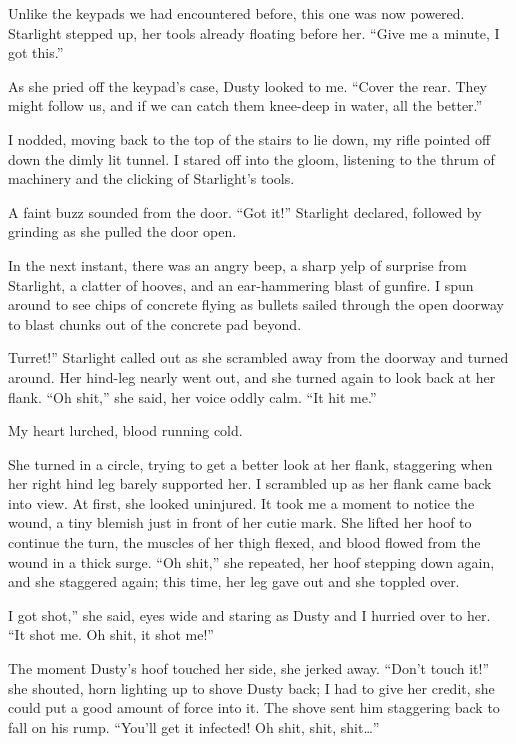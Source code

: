 Unlike the keypads we had encountered before, this one was now powered. Starlight stepped up, her tools already floating before her. “Give me a minute, I got this.”

As she pried off the keypad’s case, Dusty looked to me. “Cover the rear. They might follow us, and if we can catch them knee-deep in water, all the better.”

I nodded, moving back to the top of the stairs to lie down, my rifle pointed off down the dimly lit tunnel. I stared off into the gloom, listening to the thrum of machinery and the clicking of Starlight’s tools.

A faint buzz sounded from the door. “Got it!” Starlight declared, followed by grinding as she pulled the door open.

In the next instant, there was an angry beep, a sharp yelp of surprise from Starlight, a clatter of hooves, and an ear-hammering blast of gunfire. I spun around to see chips of concrete flying as bullets sailed through the open doorway to blast chunks out of the concrete pad beyond.

\leavevmode{}Turret!” Starlight called out as she scrambled away from the doorway and turned around. Her hind-leg nearly went out, and she turned again to look back at her flank. “Oh shit,” she said, her voice oddly calm. “It hit me.”

My heart lurched, blood running cold.

She turned in a circle, trying to get a better look at her flank, staggering when her right hind leg barely supported her. I scrambled up as her flank came back into view. At first, she looked uninjured. It took me a moment to notice the wound, a tiny blemish just in front of her cutie mark. She lifted her hoof to continue the turn, the muscles of her thigh flexed, and blood flowed from the wound in a thick surge. “Oh shit,” she repeated, her hoof stepping down again, and she staggered again; this time, her leg gave out and she toppled over.

\leavevmode{}I got shot,” she said, eyes wide and staring as Dusty and I hurried over to her. “It shot me. Oh shit, it shot me!”

The moment Dusty’s hoof touched her side, she jerked away. “Don’t touch it!” she shouted, horn lighting up to shove Dusty back; I had to give her credit, she could put a good amount of force into it. The shove sent him staggering back to fall on his rump. “You’ll get it infected! Oh shit, shit, shit…”

